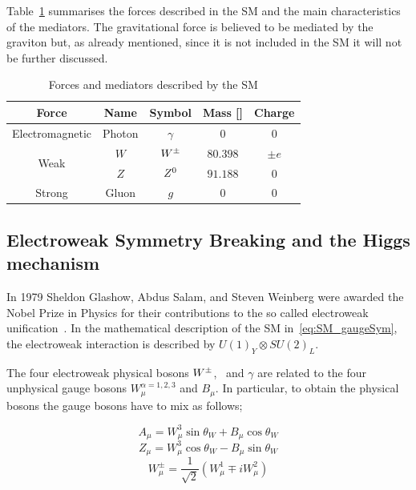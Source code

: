 			Table~\ref{tab:interactions} summarises the forces described in the \ac{SM} and the main characteristics of the mediators. The gravitational force is believed to be mediated by the graviton but, as already mentioned, since it is not included in the \ac{SM} it will not be further discussed.

			\begin{table}[!htb]\centering\caption{Forces and mediators described by the \ac{SM}}							
				\begin{tabular}{ccccc}
					\toprule
					\textbf{Force} & \textbf{Name} & \textbf{Symbol} & \textbf{Mass} [\GeV]& \textbf{Charge} \\ 
					\toprule
					Electromagnetic & Photon & $\gamma$ & 0 & 0 \\ \midrule
					\multirow{2}{*}{Weak} & $W$ & $W^{\pm}$ & $80.398$ & $\pm e$ \\
					& $Z$ & $Z^0$ & $91.188$ & 0 \\\midrule
					Strong & Gluon & $g$ & $0$ & $0$ \\\bottomrule
				\end{tabular}						
			\label{tab:interactions} 
			\end{table}


		\subsection{Electroweak Symmetry Breaking and the Higgs mechanism}
		\label{sec:ewksb}

			In 1979 Sheldon Glashow, Abdus Salam, and Steven Weinberg were awarded the Nobel Prize in Physics for their contributions to the so called electroweak unification~\cite{Glashow:1961tr,SALAM1964168,PhysRevLett.19.1264}. In the mathematical description of the \ac{SM} in~\ref{eq:SM_gaugeSym}, the electroweak interaction is described by $U(1)_Y \otimes SU(2)_L$. 

			The four electroweak physical bosons $W^{\pm}$, \Zboson\ and $\gamma$ are related to the four unphysical gauge bosons $W_{\mu}^{\alpha = 1,2,3}$ and $B_\mu$. In particular, to obtain the physical bosons the gauge bosons have to mix as follows;

			\begin{equation}
			\label{eq:photon}
				A_{\mu} = W_{\mu}^3 \sin\theta_W  + B_{\mu}\cos \theta_W 
			\end{equation}
			\begin{equation}
			\label{eq:Zboson}
				Z_{\mu} = W_{\mu}^3\cos\theta_W  - B_{\mu} \sin \theta_W
			\end{equation}
			\begin{equation}
			\label{eq:Wboson}
				W_{\mu}^\pm = \frac{1}{\sqrt{2}} \displaystyle \left ( W_{\mu}^1 \mp i W_{\mu}^2 \right )
			\end{equation}

